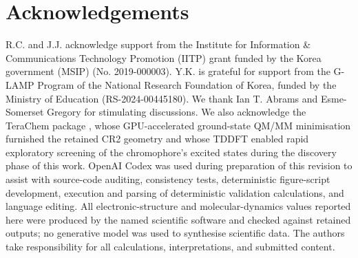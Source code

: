 \documentclass[journal=jpcbfk, manuscript=article, layout=twocolumn, doi=true]{achemso}
\begin{document}
\section{Acknowledgements}
R.C. and J.J. acknowledge support from the Institute for Information \& Communications Technology Promotion (IITP) grant funded by the Korea government (MSIP) (No. 2019-000003). Y.K. is grateful for support from the G-LAMP Program of the National Research Foundation of Korea, funded by the Ministry of Education (RS-2024-00445180). We thank Ian T. Abrams and Esme-Somerset Gregory for stimulating discussions. We also acknowledge the TeraChem package \cite{terachem2009,seritan2021terachem}, whose GPU-accelerated ground-state QM/MM minimisation furnished the retained CR2 geometry and whose TDDFT enabled rapid exploratory screening of the chromophore's excited states during the discovery phase of this work. OpenAI Codex was used during preparation of this revision to assist with source-code auditing, consistency tests, deterministic figure-script development, execution and parsing of deterministic validation calculations, and language editing. All electronic-structure and molecular-dynamics values reported here were produced by the named scientific software and checked against retained outputs; no generative model was used to synthesise scientific data. The authors take responsibility for all calculations, interpretations, and submitted content.


\end{document}
